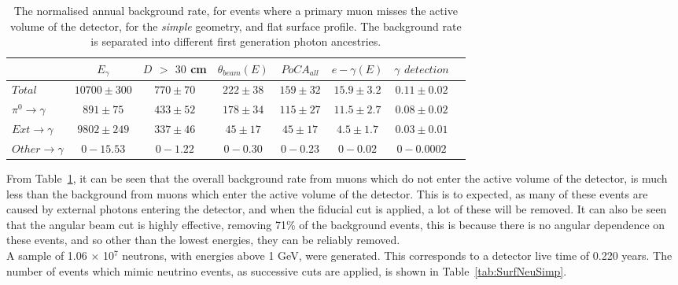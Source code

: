 \begin{table}
  \caption[The normalised annual background rate, for events where a primary muon misses the active volume of the detector, for the \emph{simple} geometry, and flat surface profile]
          {The normalised annual background rate, for events where a primary muon misses the active volume of the detector, for the \emph{simple} geometry, and flat surface profile. The background rate is separated into different first generation photon ancestries.}
  \label{tab:SurfMuMissSimp}
  \centering
  \scriptsize
  \begin{tabular}{l c c c c c c c }
    \toprule
        & $E_\gamma$ &  $D$ $>$ $30$ cm & $\theta_{beam}(E)$ & $PoCA_{all}$ & $e-\gamma(E)$ & $\gamma$ $detection$ \\
        \midrule
        $Total$          & $10700\pm300$ & $770\pm70$ & $222\pm38$ & $159\pm32$ & $15.9\pm3.2$ & $0.11\pm0.02$ \\

        $\pi^0\to\gamma$ & $891\pm75$      & $433\pm52$ & $178\pm34$ & $115\pm27$ & $11.5\pm2.7$ & $0.08\pm0.02$ \\

        $Ext\to\gamma$   & $9802\pm249$  & $337\pm46$ & $45\pm17$  & $45\pm17$  & $4.5\pm1.7$  & $0.03\pm0.01$ \\

        $Other\to\gamma$ & $0-15.53$     & $0-1.22$   & $0-0.30$   & $0-0.23$   & $0-0.02$     & $0-0.0002$ \\
        \bottomrule
  \end{tabular}
\end{table}

From Table~\ref{tab:SurfMuMissSimp}, it can be seen that the overall background rate from muons which do not enter the active volume of the detector, is much less than the background from muons which enter the active volume of the detector. This is to expected, as many of these events are caused by external photons entering the detector, and when the fiducial cut is applied, a lot of these will be removed. It can also be seen that the angular beam cut is highly effective, removing 71\% of the background events, this is because there is no angular dependence on these events, and so other than the lowest energies, they can be reliably removed. \\ 

A sample of 1.06 $\times$ 10$^{7}$ neutrons, with energies above 1 GeV, were generated. This corresponds to a detector live time of 0.220 years. The number of events which mimic neutrino events, as successive cuts are applied, is shown in Table~\ref{tab:SurfNeuSimp}. \\

